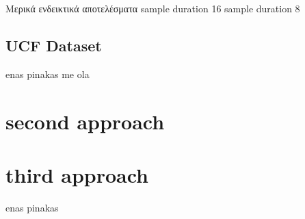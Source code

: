 \documentclass{report}
\begin{document}
Μερικά ενδεικτικά αποτελέσματα
sample duration 16
sample duration 8

\subsection {UCF Dataset}
enas pinakas me ola

\section{second approach}

\section{third approach}
enas pinakas
\end{document}
